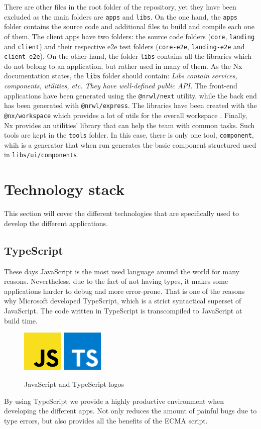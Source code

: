 \documentclass[a4paper, 12pt, oneside]{book}
\begin{document}
There are other files in the root folder of the repository, yet they have been excluded as the main folders are \texttt{apps} and \texttt{libs}. On the one hand, the \texttt{apps} folder contains the source code and additional files to build and compile each one of them. The client apps have two folders: the source code folders (\texttt{core}, \texttt{landing} and \texttt{client}) and their respective e2e test folders (\texttt{core-e2e}, \texttt{landing-e2e} and \texttt{client-e2e}). On the other hand, the folder \texttt{libs} contains all the libraries which do not belong to an application, but rather used in many of them. As the Nx documentation states, the \texttt{libs} folder should contain: \emph{Libs contain services, components, utilities, etc. They have well-defined public API.} The front-end applications have been generated using the \texttt{@nrwl/next} utility, while the back end has been generated with \texttt{@nrwl/express}. The libraries have been created with the \texttt{@nx/workspace} which provides a lot of utils for the overall workspace \cite{nx}. Finally, Nx provides an utilities' library that can help the team with common tasks. Such tools are kept in the \texttt{tools} folder. In this case, there is only one tool, \texttt{component}, whih is a generator that when run generates the basic component structured used in \texttt{libs/ui/components}.
\section{Technology stack}
This section will cover the different technologies that are specifically used to develop the different applications.
\subsection{TypeScript}
These days JavaScript is the most used language around the world for many reasons. Nevertheless, due to the fact of not having types, it makes some applications harder to debug and more error-prone. That is one of the reasons why Microsoft developed TypeScript, which is a strict syntactical superset of JavaScript. The code written in TypeScript is transcompiled to JavaScript at build time.
\begin{figure}[H]
	\centering
	\includegraphics[width=0.175\textwidth]{assets/js-logo.png}
	\includegraphics[width=0.175\textwidth]{assets/ts-logo.png}
	\caption{JavaScript and TypeScript logos}
\end{figure}
By using TypeScript we provide a highly productive environment when developing the different apps. Not only reduces the amount of painful bugs due to type errors, but also provides all the benefits of the ECMA script.
\end{document}
